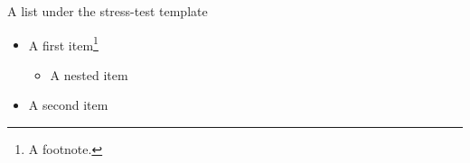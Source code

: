 \begin{standardframe}{A list under the stress-test template}
	\begin{itemize}
		\item A first item\footnote{A footnote.}
		\begin{itemize}
			\item A nested item
		\end{itemize}
		\item A second item
	\end{itemize}
\end{standardframe}
